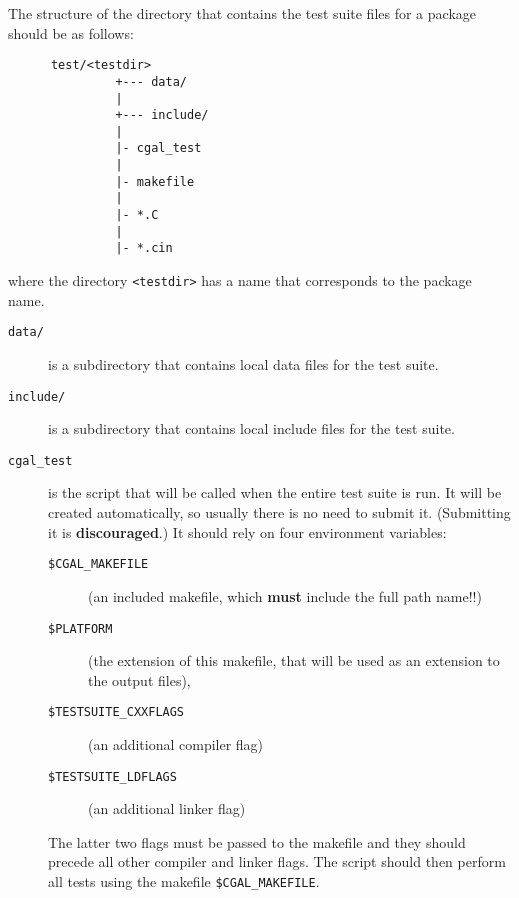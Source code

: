 The structure of the directory that contains the test suite files for 
a package should be as follows: 

\begin{verbatim}
      test/<testdir>
               +--- data/
               |
               +--- include/
               |
               |- cgal_test
               |
               |- makefile
               |
               |- *.C
               |
               |- *.cin
\end{verbatim}
where the directory \verb|<testdir>| has a name that corresponds to the package
name.

\begin{description}
   \item[{\tt data/}] is a subdirectory that contains local data files for the
        test suite.
   \item[{\tt include/}] is a subdirectory that contains local include files for
        the test suite.
   \item[{\tt cgal\_test}]
        is the script that will be called when the entire
        test suite is run. It will be created automatically, so usually there
	is no need to submit it. (Submitting it is {\bf discouraged}.)
	It should rely on four environment variables:
        \begin{description}
            \item[{\tt \$CGAL\_MAKEFILE}]%
                 (an included makefile, which {\bf must} include the full path
                  name!!) 
            \item[{\tt \$PLATFORM}]%
                 (the extension of this makefile, that will 
                 be used as an extension to the output files), 
            \item[{\tt \$TESTSUITE\_CXXFLAGS}]%
                 (an additional compiler flag) 
            \item[{\tt \$TESTSUITE\_LDFLAGS}] 
                 (an additional linker flag) 
        \end{description}
        The latter two flags must be passed to the makefile%
        and they should 
        precede all other compiler and linker flags. The script should then
        perform all tests using the makefile \verb|$CGAL_MAKEFILE|. 


\end{description}
